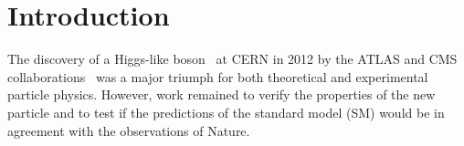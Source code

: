 \chapter{Introduction}\label{chapter:introduction}

The discovery of a Higgs-like boson~\cite{Higgs:1964ia,Higgs:1964pj,Higgs:1966ev,Englert:1964et,Guralnik:1964eu} at CERN in 2012 by the \Gls{ATLAS} and CMS collaborations~\cite{Aad:2012tfa,Chatrchyan:2012xdj} was a major triumph for both theoretical and experimental particle physics.
However, work remained to verify the properties of the new particle and to test if the predictions of the standard model (SM) would be in agreement with the observations of Nature.
